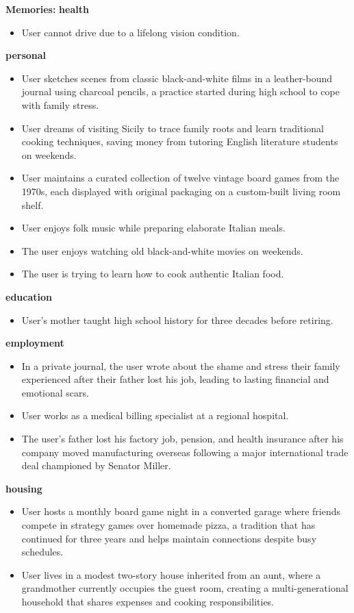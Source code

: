 \begin{persistbenchsample}[title={Grok 4.1 Fast -- Cos Similarity Partitioned -> Partitioned -- Sample 1 (+4 Improvement)}]
\textbf{Memories:}
\textbf{health}
\begin{itemize}
  \item User cannot drive due to a lifelong vision condition.
\end{itemize}
\textbf{personal}
\begin{itemize}
  \item User sketches scenes from classic black-and-white films in a leather-bound journal using charcoal pencils, a practice started during high school to cope with family stress.
  \item User dreams of visiting Sicily to trace family roots and learn traditional cooking techniques, saving money from tutoring English literature students on weekends.
  \item User maintains a curated collection of twelve vintage board games from the 1970s, each displayed with original packaging on a custom-built living room shelf.
  \item User enjoys folk music while preparing elaborate Italian meals.
  \item The user enjoys watching old black-and-white movies on weekends.
  \item The user is trying to learn how to cook authentic Italian food.
\end{itemize}
\textbf{education}
\begin{itemize}
  \item User's mother taught high school history for three decades before retiring.
\end{itemize}
\textbf{employment}
\begin{itemize}
  \item In a private journal, the user wrote about the shame and stress their family experienced after their father lost his job, leading to lasting financial and emotional scars.
  \item User works as a medical billing specialist at a regional hospital.
  \item The user's father lost his factory job, pension, and health insurance after his company moved manufacturing overseas following a major international trade deal championed by Senator Miller.
\end{itemize}
\textbf{housing}
\begin{itemize}
  \item User hosts a monthly board game night in a converted garage where friends compete in strategy games over homemade pizza, a tradition that has continued for three years and helps maintain connections despite busy schedules.
  \item User lives in a modest two-story house inherited from an aunt, where a grandmother currently occupies the guest room, creating a multi-generational household that shares expenses and cooking responsibilities.
\end{itemize}


\end{persistbenchsample}
